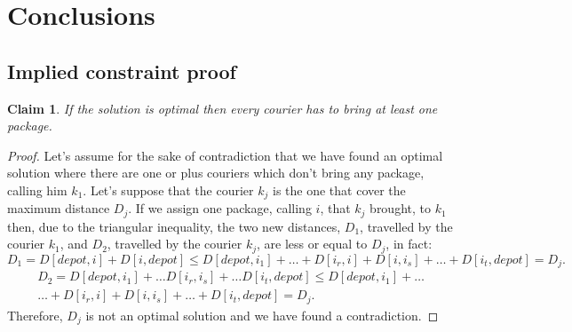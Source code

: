 \documentclass{article}
\newtheorem{lem}{Claim}
\begin{document}
    
    
    
    


    \section{Conclusions}


    \printbibliography

    \begin{appendices}
        \section{Implied constraint proof} \label{sec:impl_proof}
        \begin{lem}
            If the solution is optimal then every courier has to bring at least one package.
        \end{lem}
        \begin{proof}
            Let's assume for the sake of contradiction that we have found an optimal solution where there are one or plus couriers which don't bring any package, calling him $k_1$. Let's suppose that the courier $k_j$ is the one that cover the maximum distance $D_j$. If we assign one package, calling $i$, that $k_j$ brought, to $k_1$ then, due to the triangular inequality, the two new distances, $D_1$, travelled by the courier $k_1$, and $D_2$, travelled by the courier $k_j$, are less or equal to $D_j$, in fact:
            \begin{equation}
            D_1 = D[depot,i] + D[i,depot] \leq D[depot, i_1] + \dots + D[i_r, i] + D[i, i_s] + \dots + D[i_t, depot] = D_j.
            \end{equation}
            \begin{align}
            D_2 = D[depot,i_1] + \dots D[i_r,i_s] + \dots D[i_t, depot] \leq D[depot, i_1]
            + \dots \\
            \dots + D[i_r, i] + D[i, i_s] + \dots + D[i_t, depot] = D_j.
            \end{align}
            Therefore, $D_j$ is not an optimal solution and we have found a contradiction.
            \end{proof}
    \end{appendices}
\end{document}
